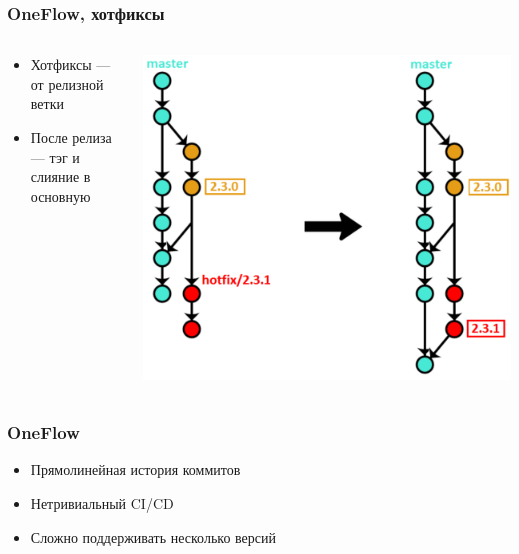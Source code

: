 \documentclass{../../slides-style}
\begin{document}
    \begin{frame}
        \frametitle{OneFlow, хотфиксы}
        \begin{columns}
            \begin{column}{0.4\textwidth}
                \begin{itemize}
                    \item Хотфиксы --- от релизной ветки
                    \item После релиза --- тэг и слияние в основную
                \end{itemize}
            \end{column}
            \begin{column}{0.6\textwidth}
                \begin{center}
                    \includegraphics[height=0.7\textheight]{oneflow5.png}
                \end{center}
            \end{column}
        \end{columns}
    \end{frame}

    \begin{frame}
        \frametitle{OneFlow}
        \begin{itemize}
            \item Прямолинейная история коммитов
            \item Нетривиальный CI/CD
            \item Сложно поддерживать несколько версий
        \end{itemize}
    \end{frame}
\end{document}
